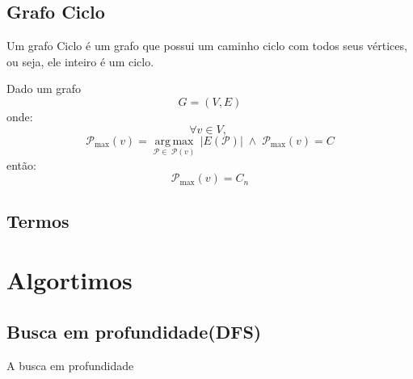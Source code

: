 \documentclass{report}
\begin{document}
\section{Grafo Ciclo}
Um grafo Ciclo é um grafo que possui um caminho ciclo com todos seus vértices, ou seja, ele inteiro é um ciclo.

\begin{center}
\end{center}
{
Dado um grafo
\[
	G = (V,E)
\]
onde:
\[
	\forall v \in V, \;
\]
\[
	\mathcal{P}_{\text{max}}(v) = \underset{\mathcal{P} \in \; \mathcal{P}(v)}{\operatorname{arg\,max}} \, |E(\mathcal{P})| \; \land \; \mathcal{P}_{\text{max}}(v) = C
\]
então:
\[
	\mathcal{P}_{\text{max}}(v) = C_n
\]

}

\section{Termos}
\chapter{Algortimos}
\section{Busca em profundidade(DFS)}
A busca em profundidade
\chapter{}
\end{document}
